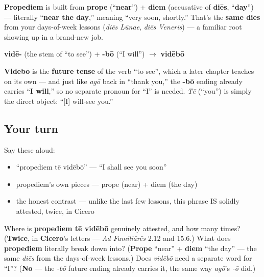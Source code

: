 \begin{cousinweb}
\textbf{Propediem} is built from \textbf{prope} (\textquotedblleft{}\textbf{near}\textquotedblright{}) + \textbf{diem} (accusative of \textbf{diēs}, \textquotedblleft{}\textbf{day}\textquotedblright{}) — literally \textquotedblleft{}\textbf{near the day},\textquotedblright{} meaning \textquotedblleft{}very soon, shortly.\textquotedblright{} That's the \textbf{same diēs} from your days-of-week lessons (\emph{diēs Lūnae}, \emph{diēs Veneris}) — a familiar root showing up in a brand-new job.
\end{cousinweb}

\begin{grammarlens}[title={Grammar Lens: vidēbō — the verb ending doing the work, again}]
\textbf{vidē-} (the stem of \textquotedblleft{}to see\textquotedblright{}) + \textbf{-bō} (\textquotedblleft{}I will\textquotedblright{}) $\to$ \textbf{vidēbō}

\textbf{Vidēbō} is the \textbf{future tense} of the verb \textquotedblleft{}to see\textquotedblright{}, which a later chapter teaches on its own — and just like \emph{agō} back in \textquotedblleft{}thank you,\textquotedblright{} the \textbf{-bō} ending already carries \textquotedblleft{}\textbf{I will},\textquotedblright{} so no separate pronoun for \textquotedblleft{}I\textquotedblright{} is needed. \emph{Tē} (\textquotedblleft{}you\textquotedblright{}) is simply the direct object: \textquotedblleft{}{[}I{]} will-see you.\textquotedblright{}
\end{grammarlens}

\subsection*{Your turn}
Say these aloud:

\begin{itemize}
\raggedright
  \item \textquotedblleft{}propediem tē vidēbō\textquotedblright{} — \textquotedblleft{}I shall see you soon\textquotedblright{}
  \item propediem's own pieces — prope (near) + diem (the day)
  \item the honest contrast — unlike the last few lessons, this phrase IS solidly attested, twice, in Cicero
\end{itemize}

\begin{tcolorbox}[breakable,colback=teal!4,colframe=teal!35!black,title={Before you move on}]
Where is \textbf{propediem tē vidēbō} genuinely attested, and how many times? (\textbf{Twice}, in \textbf{Cicero}'s letters — \emph{Ad Familiārēs} 2.12 and 15.6.) What does \textbf{propediem} literally break down into? (\textbf{Prope} \textquotedblleft{}near\textquotedblright{} + \textbf{diem} \textquotedblleft{}the day\textquotedblright{} — the same \emph{diēs} from the days-of-week lessons.) Does \emph{vidēbō} need a separate word for \textquotedblleft{}I\textquotedblright{}? (\textbf{No} — the \emph{-bō} future ending already carries it, the same way \emph{agō}'s \emph{-ō} did.)
\end{tcolorbox}
